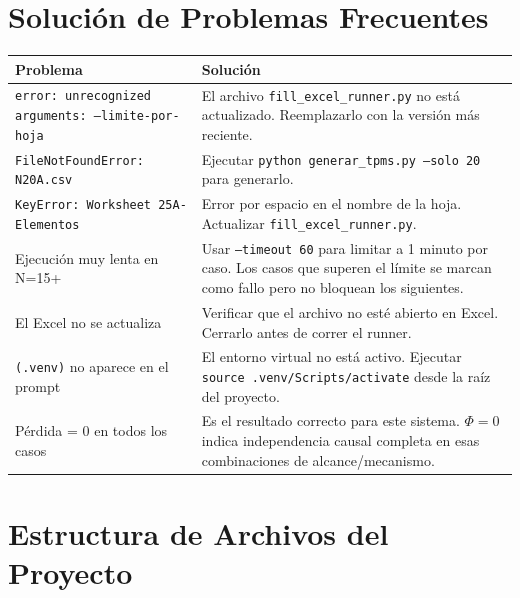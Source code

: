 \documentclass[12pt,a4paper]{article}
\begin{document}
\section{Solución de Problemas Frecuentes}

\begin{longtable}{p{5cm} p{8cm}}
    \toprule
    Problema & Solución \\
    \midrule
    \endhead
    \texttt{error: unrecognized arguments: --limite-por-hoja} &
    El archivo \texttt{fill\_excel\_runner.py} no está actualizado. Reemplazarlo con la versión más reciente. \\
    \addlinespace
    \texttt{FileNotFoundError: N20A.csv} &
    Ejecutar \texttt{python generar\_tpms.py --solo 20} para generarlo. \\
    \addlinespace
    \texttt{KeyError: Worksheet 25A-Elementos} &
    Error por espacio en el nombre de la hoja. Actualizar \texttt{fill\_excel\_runner.py}. \\
    \addlinespace
    Ejecución muy lenta en N=15+ &
    Usar \texttt{--timeout 60} para limitar a 1 minuto por caso. Los casos que superen el límite se marcan como fallo pero no bloquean los siguientes. \\
    \addlinespace
    El Excel no se actualiza &
    Verificar que el archivo no esté abierto en Excel. Cerrarlo antes de correr el runner. \\
    \addlinespace
    \texttt{(.venv)} no aparece en el prompt &
    El entorno virtual no está activo. Ejecutar \texttt{source .venv/Scripts/activate} desde la raíz del proyecto. \\
    \addlinespace
    Pérdida = 0 en todos los casos &
    Es el resultado correcto para este sistema. $\Phi = 0$ indica independencia causal completa en esas combinaciones de alcance/mecanismo. \\
    \bottomrule
\end{longtable}

\section{Estructura de Archivos del Proyecto}
\end{document}
